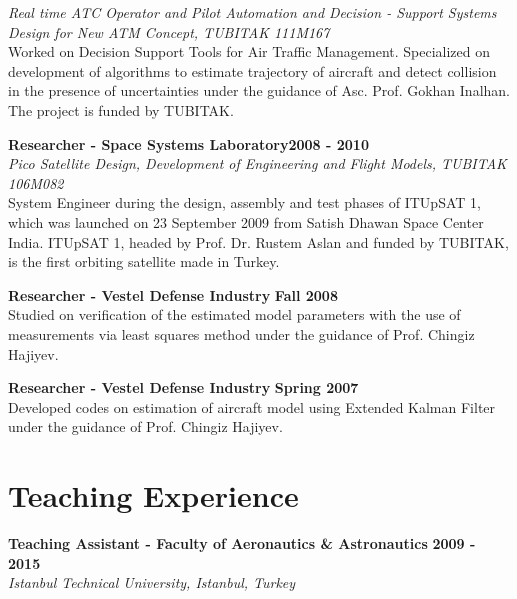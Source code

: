 \documentclass[margin,line]{res}
\begin{document}
\begin{resume}
{\em Real time ATC Operator and Pilot Automation and Decision - Support Systems Design for New ATM Concept, TUBITAK 111M167 }  \\
Worked on Decision Support Tools for Air Traffic Management. Specialized on development of algorithms to estimate trajectory of aircraft and detect collision in the presence of uncertainties under the guidance of Asc. Prof. Gokhan Inalhan. The project is funded by TUBITAK.
\vspace*{-.05in}

{\bf Researcher - Space Systems Laboratory}\hfill {\bf 2008 - 2010}\\ 
{\em Pico Satellite Design, Development of Engineering and Flight Models, TUBITAK 106M082 }\\ 
System Engineer during the design, assembly and test phases of ITUpSAT 1, which was launched on 23 September 2009 from Satish Dhawan Space Center India. ITUpSAT 1, headed by Prof. Dr. Rustem Aslan and funded by TUBITAK, is the first orbiting satellite made in Turkey.
\vspace*{-.05in}

{\bf Researcher - Vestel Defense Industry} \hfill {\bf Fall 2008}\\
Studied on verification of the estimated model parameters with the use of measurements via least squares method under the guidance of Prof. Chingiz Hajiyev.
\vspace*{-.05in}

{\bf Researcher - Vestel Defense Industry} \hfill {\bf Spring 2007}\\
Developed codes on estimation of aircraft model using Extended Kalman Filter under the guidance of Prof. Chingiz Hajiyev.
\vspace*{-.05in}

\section{\sc Teaching Experience}

{\bf Teaching Assistant - Faculty of Aeronautics \& Astronautics}  \hfill {\bf 2009 - 2015}\\
{\em Istanbul Technical University, Istanbul, Turkey}
\vspace*{-.05in}


\end{resume}
\end{document}
